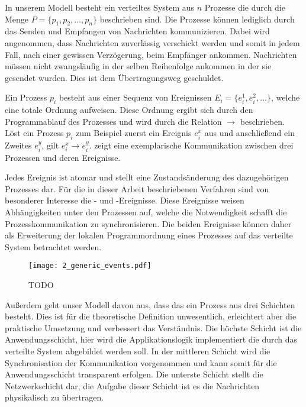 In unserem Modell besteht ein verteiltes System aus $n$ Prozesse die durch die Menge $P=\{p_1, p_2,\ldots, p_n\}$ beschrieben sind.
Die Prozesse können lediglich durch das Senden und Empfangen von Nachrichten kommunizieren.
Dabei wird angenommen, dass Nachrichten zuverlässig verschickt werden und somit in jedem Fall, nach einer gewissen Verzögerung, beim Empfänger ankommen.
Nachrichten müssen nicht zwangsläufig in der selben Reihenfolge ankommen in der sie gesendet wurden.
Dies ist dem Übertragungsweg geschuldet.

Ein Prozess $p_i$ besteht aus einer Sequenz von Ereignissen $E_i=\{e_i^1, e_i^2, \ldots\}$, welche eine totale Ordnung aufweisen.
Diese Ordnung ergibt sich durch den Programmablauf des Prozesses und wird durch die Relation $\rightarrow$ beschrieben.
Löst ein Prozess $p_i$ zum Beispiel zuerst ein Ereignis $e_i^x$ aus und anschließend ein Zweites $e_i^y$, gilt $e_i^x \rightarrow e_i^y$.  zeigt eine exemplarische Kommunikation zwischen drei Prozessen und deren Ereignisse.

Jedes Ereignis ist atomar und stellt eine Zustandsänderung des dazugehörigen Prozesses dar.
Für die in dieser Arbeit beschriebenen Verfahren sind von besonderer Interesse die - und -Ereignisse.
Diese Ereignisse weisen Abhängigkeiten unter den Prozessen auf, welche die Notwendigkeit schafft die Prozesskommunikation zu synchronisieren.
Die beiden Ereignisse können daher als Erweiterung der lokalen Programmordnung eines Prozesses auf das verteilte System betrachtet werden.

\begin{figure}[ht]
    \centering
    \texttt{[image: 2\_generic\_events.pdf]}
    \caption[Beispiel einer beliebigen Kommunikation]{TODO}
    \label{fig:genericEvents}
\end{figure}

Außerdem geht unser Modell davon aus, dass das ein Prozess aus drei Schichten besteht.
Dies ist für die theoretische Definition unwesentlich, erleichtert aber die praktische Umsetzung und verbessert das Verständnis.
Die höchste Schicht ist die Anwendungsschicht, hier wird die Applikationslogik implementiert die durch das verteilte System abgebildet werden soll.
In der mittleren Schicht wird die Synchronisation der Kommunikation vorgenommen und kann somit für die Anwendungsschicht transparent  erfolgen.
Die unterste Schicht stellt die Netzwerkschicht dar, die Aufgabe dieser Schicht ist es die Nachrichten physikalisch zu übertragen.

